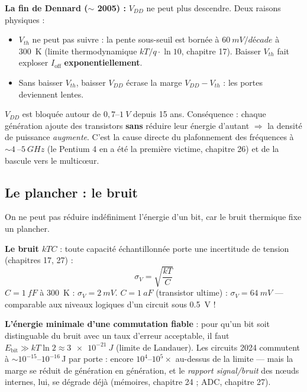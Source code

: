 \documentclass[12pt,a4paper,twoside]{book}
\begin{document}
\begin{attention}
\textbf{La fin de Dennard ($\sim$ 2005) :} $V_{DD}$ ne peut plus descendre. Deux raisons physiques :
\begin{itemize}[nosep]
\item $V_{th}$ ne peut pas suivre : la pente sous-seuil est bornée à $\SI{60}{mV/décade}$ à \SI{300}{K} (limite thermodynamique $kT/q\cdot\ln 10$, chapitre 17). Baisser $V_{th}$ fait exploser $I_{\text{off}}$ \textbf{exponentiellement}.
\item Sans baisser $V_{th}$, baisser $V_{DD}$ écrase la marge $V_{DD} - V_{th}$ : les portes deviennent lentes.
\end{itemize}
$V_{DD}$ est bloquée autour de $0{,}7$--$\SI{1}{V}$ depuis 15 ans. Conséquence : chaque génération ajoute des transistors \textbf{sans} réduire leur énergie d'autant $\Rightarrow$ la densité de puissance \textit{augmente}. C'est la cause directe du plafonnement des fréquences à $\sim\SI{4}{}$--$\SI{5}{GHz}$ (le Pentium 4 en a été la première victime, chapitre 26) et de la bascule vers le multicœur.
\end{attention}

\subsection{Le plancher : le bruit}

\begin{formule}
On ne peut pas réduire indéfiniment l'énergie d'un bit, car le bruit thermique fixe un plancher.

\textbf{Le bruit $kTC$} : toute capacité échantillonnée porte une incertitude de tension (chapitres 17, 27) :
\[
\boxed{\sigma_V = \sqrt{\frac{kT}{C}}}
\]
$C = \SI{1}{fF}$ à \SI{300}{K} : $\sigma_V = \SI{2}{mV}$. $C = \SI{1}{aF}$ (transistor ultime) : $\sigma_V = \SI{64}{mV}$ --- comparable aux niveaux logiques d'un circuit sous \SI{0.5}{V} !

\textbf{L'énergie minimale d'une commutation fiable} : pour qu'un bit soit distinguable du bruit avec un taux d'erreur acceptable, il faut $E_{\text{bit}} \gg kT\ln 2 \approx \SI{3e-21}{J}$ (limite de Landauer). Les circuits 2024 commutent à $\sim 10^{-15}$--$10^{-16}\,$J par porte : encore $10^4$--$10^5 \times$ au-dessus de la limite --- mais la marge se réduit de génération en génération, et le \textit{rapport signal/bruit} des nœuds internes, lui, se dégrade déjà (mémoires, chapitre 24 ; ADC, chapitre 27).
\end{formule}
\end{document}
